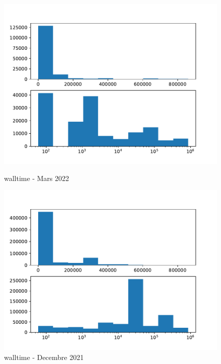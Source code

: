 \documentclass[a4paper]{article}
\begin{document}
\begin{figure}[H]
\begin{minipage}[b]{0.5\linewidth}
    \centering
    \includegraphics[width=1.11\linewidth]{MBSS/plot/Distribution/2022_03_walltime.pdf} 
    \caption{walltime - Mars 2022} 
    \vspace{4ex}
  \end{minipage}%
  \begin{minipage}[b]{0.5\linewidth}
    \centering
    \includegraphics[width=1.11\linewidth]{MBSS/plot/Distribution/2021_12_walltime.pdf} 
    \caption{walltime - Decembre 2021} 
    \vspace{4ex}
  \end{minipage}%
\end{figure}
\end{document}
